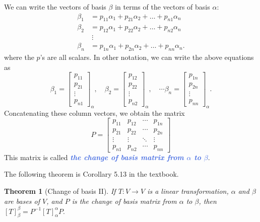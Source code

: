 \documentclass[10pt]{article}
\newcommand{\demph}[1]{\textcolor{RoyalBlue}{\textbf{\slshape #1}}} %
\newtheorem{theorem}{Theorem}
\theoremstyle{definition}
\begin{document}
We can write the vectors of basis $\beta$ in terms of the vectors of basis
$\alpha$:
\begin{align*}
  \beta_{1} &= p_{11}\alpha_{1}+p_{21}\alpha_{2}+\ldots+p_{n1}\alpha_{n}
  \\
  \beta_{2} &= p_{12}\alpha_{1}+p_{22}\alpha_{2}+\ldots+p_{n2}\alpha_{n}\\
            &\ \vdots\\
  \beta_{n} &= p_{1n}\alpha_{1}+p_{2n}\alpha_{2}+\ldots+p_{nn}\alpha_{n}.
\end{align*}
where the $p$'s are all scalars. In other notation, we can write the above
equations as
\begin{equation*} 
  \beta_{1} = \begin{bmatrix}
    p_{11}\\
    p_{21}\\
    \vdots\\
    p_{n1}
  \end{bmatrix}_{\alpha}, \quad
  \beta_{2}=\begin{bmatrix}
    p_{12}\\
    p_{22}\\
    \vdots\\
    p_{n2}
  \end{bmatrix}_{\alpha}, \quad
  \cdots
  \beta_{n}=\begin{bmatrix}
    p_{1n}\\
    p_{2n}\\
    \vdots\\
    p_{nn}
  \end{bmatrix}_{\alpha}.
\end{equation*}
Concatenating these column vectors, we obtain the matrix
\begin{equation*}
  P =
  \begin{bmatrix}
    p_{11}&p_{12}&\cdots& p_{1n}\\
    p_{21}&p_{22}&\cdots& p_{2n}\\
    \vdots&\vdots&\ddots&\vdots\\
    p_{n1}&p_{n2}&\cdots& p_{nn}
  \end{bmatrix}
\end{equation*}
This matrix is called \demph{the change of basis matrix from $\alpha$ to
  $\beta$}.

The following theorem is Corollary 5.13 in the textbook.
\begin{theorem}[Change of basis II]
  \label{thm:change-of-basis-II}
  If $T:V\to V$ is a linear transformation, $\alpha$ and $\beta$ are bases of
  $V$, and $P$ is the change of basis matrix from $\alpha$ to $\beta$, then
  $[T]_{\beta}^{\beta} = P^{-1}[T]_{\alpha}^{\alpha}P.$
\end{theorem}
\end{document}
